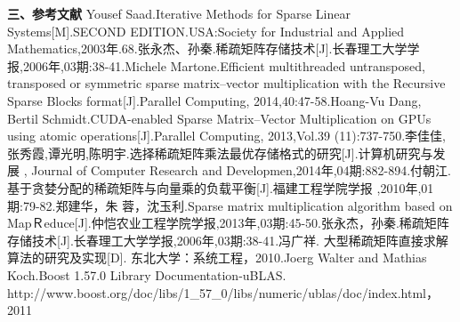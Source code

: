 \documentclass{article}
\begin{document}
\textbf{三、参考文献}
      \qquad
\newline
 [1]Yousef Saad.Iterative Methods for Sparse Linear Systems[M].SECOND EDITION.USA:Society for Industrial and Applied Mathematics,2003年.68.\newline
 [2]张永杰、孙秦.稀疏矩阵存储技术[J].长春理工大学学报,2006年,03期:38-41.\newline
  [x]Michele Martone.Efficient multithreaded untransposed, transposed or symmetric sparse matrix–vector multiplication with the Recursive Sparse Blocks format[J].Parallel Computing, 2014,40:47-58.\newline
   [y]Hoang-Vu Dang,  Bertil Schmidt.CUDA-enabled Sparse Matrix–Vector Multiplication on GPUs
using atomic operations[J].Parallel Computing, 2013,Vol.39 (11):737-750.\newline
  [a]李佳佳,张秀霞,谭光明,陈明宇.选择稀疏矩阵乘法最优存储格式的研究[J].计算机研究与发展 , Journal of Computer Research and Developmen,2014年,04期:882-894.\newline
[b]付朝江.基于贪婪分配的稀疏矩阵与向量乘的负载平衡[J].福建工程学院学报 ,2010年,01期:79-82.\newline
[d]郑建华，朱 蓉，沈玉利.Sparse matrix multiplication algorithm based on MapＲeduce[J].仲恺农业工程学院学报,2013年,03期:45-50.\newline
[f]张永杰，孙秦.稀疏矩阵存储技术[J].长春理工大学学报,2006年,03期:38-41.\newline
 [e]冯广祥. 大型稀疏矩阵直接求解算法的研究及实现[D].  东北大学：系统工程，2010.\newline
 [h]Joerg Walter and Mathias Koch.Boost 1.57.0 Library Documentation-uBLAS. http://www.boost.org/doc/libs/1\_57\_0/libs/numeric/ublas/doc/index.html， 2011\newline
\end{document}
